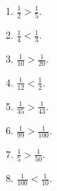 \documentclass[10 pt,usenames,dvipsnames, oneside]{article}
\begin{document}
\ifdefined\prof
\begin{solucao}

  \begin{multicols}{2}
\begin{enumerate}
 \item $\frac{1}{2}>\frac{1}{5}$.
\item $\frac{1}{4}<\frac{1}{3}$.
\item $\frac{1}{10}>\frac{1}{20}$.
\item $\frac{1}{12}<\frac{1}{2}$.
\item $\frac{1}{35}>\frac{1}{43}$.
\item  $\frac{1}{99}>\frac{1}{100}$.
\item  $\frac{1}{5}>\frac{1}{50}$.
\item  $\frac{1}{100}<\frac{1}{10}$.
\end{enumerate}
  \end{multicols}

\end{solucao}
\fi
\end{document}
